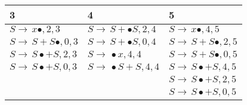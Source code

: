 \begin{isabellebody}
\begin{isamarkuptext}
\begin{table}[htpb]
\begin{tabular}{| l | l | l |}
        3                                      & 4                                      & 5 \\
      \midrule
        $S \rightarrow \, x \bullet, 2, 3$     & $S \rightarrow \, S + \bullet S, 2, 4$ & $S \rightarrow \, x \bullet, 4, 5$     \\
        $S \rightarrow \, S + S \bullet, 0, 3$ & $S \rightarrow \, S + \bullet S, 0, 4$ & $S \rightarrow \, S + S \bullet, 2, 5$ \\
        $S \rightarrow \, S \bullet + S, 2, 3$ & $S \rightarrow \, \bullet x, 4, 4$     & $S \rightarrow \, S + S \bullet, 0, 5$ \\
        $S \rightarrow \, S \bullet + S, 0, 3$ & $S \rightarrow \, \bullet S + S, 4, 4$ & $S \rightarrow \, S \bullet + S, 4, 5$ \\
                                               &                                        & $S \rightarrow \, S \bullet + S, 2, 5$ \\
                                               &                                        & $S \rightarrow \, S \bullet + S, 0, 5$ \\
    \end{tabular}
  \end{table}%
\end{isamarkuptext}\isamarkuptrue%
%
\isadelimtheory
%
\endisadelimtheory
%
\isatagtheory
%
\endisatagtheory
{\isafoldtheory}%
%
\isadelimtheory
%
\endisadelimtheory
%
\end{isabellebody}%
\endinput
